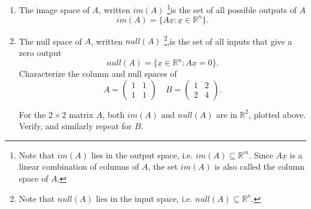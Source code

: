 \documentclass{tufte-handout}
\theoremstyle{remark}
\renewcommand{\vec}[1]{\underline{#1}}
\begin{document}
\begin{enumerate}
    \item The image space of $A$, written $im(A)$  \footnote{Note that $im(A)$ lies in the output space, i.e. $im(A) \subseteq \mathbb{R}^m$. Since $A\vec{x}$ is a linear combination of columns of $A$, the set $im(A)$ is also called the column space of $A$.}is the set of all possible outputs of $A$
    \[
    im(A) = \{A\vec{x}: \vec{x} \in \mathbb{R}^n\}.
    \] 
    \item The null space of $A$, written $null(A)$  \footnote{Note that $null(A)$ lies in the input space, i.e. $null(A) \subseteq \mathbb{R}^n$.},is the set of all inputs that give a zero output
    \[
     null(A) = \{\vec{x}  \in \mathbb{R}^n : A\vec{x}= 0\}.
    \]
Characterize the column and null spaces of \[
A = \begin{pmatrix} 1 & 1 \\ 1 & 1 \end{pmatrix} \quad B = \begin{pmatrix} 1 & 2 \\ 2 & 4 \end{pmatrix}.
\]
\begin{marginfigure}
\caption{For the $2 \times 2$ matrix $A$, both $im(A)$ and $null(A)$ are in $\mathbb{R}^2$, plotted above. Verify, and similarly repeat for $B$.}
\end{marginfigure}
\end{enumerate}


%
%
\end{document}
